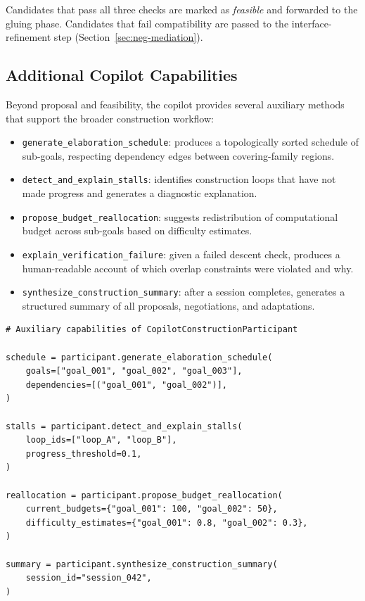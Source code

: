 \documentclass[11pt]{article}
\begin{document}
Candidates that pass all three checks are marked as \emph{feasible}
and forwarded to the gluing phase.  Candidates that fail
compatibility are passed to the interface-refinement step
(Section~\ref{sec:neg-mediation}).

\subsection{Additional Copilot Capabilities}\label{sec:proto-extra}

Beyond proposal and feasibility, the copilot provides several
auxiliary methods that support the broader construction workflow:

\begin{itemize}
  \item \texttt{generate\_elaboration\_schedule}: produces a
        topologically sorted schedule of sub-goals, respecting
        dependency edges between covering-family regions.
  \item \texttt{detect\_and\_explain\_stalls}: identifies construction
        loops that have not made progress and generates a
        diagnostic explanation.
  \item \texttt{propose\_budget\_reallocation}: suggests redistribution
        of computational budget across sub-goals based on difficulty
        estimates.
  \item \texttt{explain\_verification\_failure}: given a failed
        descent check, produces a human-readable account of which
        overlap constraints were violated and why.
  \item \texttt{synthesize\_construction\_summary}: after a session
        completes, generates a structured summary of all proposals,
        negotiations, and adaptations.
\end{itemize}

\begin{lstlisting}
# Auxiliary capabilities of CopilotConstructionParticipant

schedule = participant.generate_elaboration_schedule(
    goals=["goal_001", "goal_002", "goal_003"],
    dependencies=[("goal_001", "goal_002")],
)

stalls = participant.detect_and_explain_stalls(
    loop_ids=["loop_A", "loop_B"],
    progress_threshold=0.1,
)

reallocation = participant.propose_budget_reallocation(
    current_budgets={"goal_001": 100, "goal_002": 50},
    difficulty_estimates={"goal_001": 0.8, "goal_002": 0.3},
)

summary = participant.synthesize_construction_summary(
    session_id="session_042",
)
\end{lstlisting}
\end{document}
